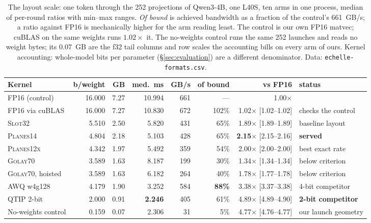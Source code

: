 \begin{table}[t]
\centering
\small
\setlength{\tabcolsep}{3pt}
\begin{tabular}{lrrrrrrl}
\toprule
Kernel & b/weight & GB & med.\ ms & GB/s & of bound & vs FP16 & status \\
\midrule
FP16 (control) & 16.000 & 7.27 & 10.994 & 661 & --- & 1.00$\times$ & \\
FP16 via cuBLAS & 16.000 & 7.27 & 10.830 & 672 & 102\% & 1.02$\times$ [1.02--1.02] & checks the control \\
\midrule
\textsc{Slot32} & 5.510 & 2.50 & 5.820 & 431 & 65\% & 1.89$\times$ [1.89--1.89] & baseline layout \\
\textsc{Planes14} & 4.804 & 2.18 & 5.103 & 428 & 65\% & \textbf{2.15$\times$} [2.15--2.16] & \textbf{served} \\
\textsc{Planes12x} & 4.342 & 1.97 & 5.492 & 359 & 54\% & 2.00$\times$ [2.00--2.00] & best exact rate \\
\textsc{Golay70} & 3.589 & 1.63 & 8.187 & 199 & 30\% & 1.34$\times$ [1.34--1.34] & below criterion \\
\textsc{Golay70}, hoisted & 3.589 & 1.63 & 6.182 & 264 & 40\% & 1.78$\times$ [1.77--1.78] & below criterion \\
\midrule
AWQ w4g128 & 4.179 & 1.90 & 3.252 & 584 & \textbf{88\%} & 3.38$\times$ [3.37--3.38] & 4-bit competitor \\
QTIP 2-bit & 2.000 & 0.91 & \textbf{2.246} & 405 & 61\% & 4.89$\times$ [4.89--4.90] & \textbf{2-bit competitor} \\
\midrule
No-weights control & 0.159 & 0.07 & 2.306 & 31 & 5\% & 4.77$\times$ [4.76--4.77] & our launch geometry \\
\bottomrule
\end{tabular}
\caption{The layout scale: one token through the 252 projections of
Qwen3-4B, one L40S, ten arms in one process, median of per-round ratios
with min--max ranges. \emph{Of bound} is achieved bandwidth as a fraction
of the control's 661~GB/s; a ratio against FP16 is mechanically higher for
the arm reading least. The control is our own FP16 matvec; cuBLAS on the
same weights runs $1.02\times$ it. The no-weights control runs the same
252 launches and reads no weight bytes; its 0.07~GB are the f32 tail columns
and row scales the accounting bills on every arm of ours. Kernel accounting:
whole-model bits per parameter (\S\ref{sec:evaluation}) are a different
denominator. Data:
\texttt{echelle-formats.csv}.}
\label{tab:layouts}
\end{table}

